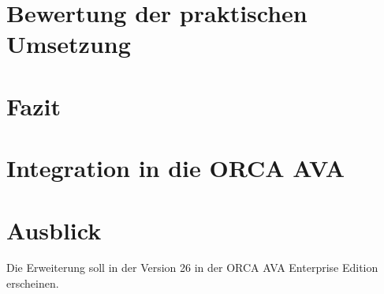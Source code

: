 \section{Bewertung der praktischen Umsetzung}
\label{c:closing:rating}
\section{Fazit}
\label{c:closing:conclusion}
\section{Integration in die ORCA AVA}
\label{c:closing:integration}
\section{Ausblick}
\label{c:closing:outlook}
Die Erweiterung soll in der Version 26 in der ORCA AVA Enterprise Edition erscheinen.
